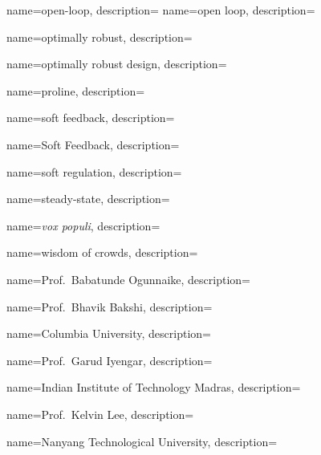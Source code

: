 
	{
		name={open-loop},
		description={}
	}
	{
		name={open loop},
		description={}
	}	

	{
		name={optimally robust},
		description={}
	}
	
	{
		name={optimally robust design},
		description={}
	}
	

	{
		name={proline},
		description={}
	}


	{
		name={soft feedback},
		description={}
	}

	{
		name={Soft Feedback},
		description={}
	}

	{
		name={soft regulation},
		description={}
	}
	
	{
		name={steady-state},
		description={}
	}	
		

	{
		name={\textit{vox populi}},
		description={}
	}	


	{
		name={wisdom of crowds},
		description={}
	}
	
	
	{
		name={Prof.~Babatunde Ogunnaike},
		description={}
	}	

	{
		name={Prof.~Bhavik Bakshi},
		description={}
	}
	
	{
		name={Columbia University},
		description={}
	}	

	{
		name={Prof.~Garud Iyengar},
		description={}
	}	
	
	{
		name={Indian Institute of Technology Madras},
		description={}
	}	

	{
		name={Prof.~Kelvin Lee},
		description={}
	}	

	{
		name={Nanyang Technological University},
		description={}
	}	

